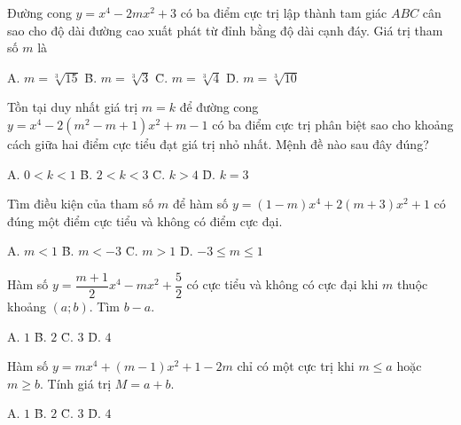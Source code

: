 \vspace{0.3cm}

 Đường cong $y = x^4 - 2mx^2 + 3$ có ba điểm cực trị lập thành tam giác $ABC$ cân sao cho độ dài đường cao xuất phát từ đỉnh bằng độ dài cạnh đáy. Giá trị tham số $m$ là
\begin{tabbing}
A. $m = \sqrt[3]{15}$ \qquad\quad \= B. $m = \sqrt[3]{3}$ \qquad\qquad \= C. $m = \sqrt[3]{4}$ \qquad\quad \= D. $m = \sqrt[3]{10}$
\end{tabbing}

\vspace{0.3cm}

 Tồn tại duy nhất giá trị $m = k$ để đường cong $y = x^4 - 2(m^2 - m + 1)x^2 + m - 1$ có ba điểm cực trị phân biệt sao cho khoảng cách giữa hai điểm cực tiểu đạt giá trị nhỏ nhất. Mệnh đề nào sau đây đúng?
\begin{tabbing}
A. $0 < k < 1$ \qquad\quad \= B. $2 < k < 3$ \qquad\quad \= C. $k > 4$ \qquad\qquad \= D. $k = 3$
\end{tabbing}
 Tìm điều kiện của tham số $m$ để hàm số $y = (1-m)x^4 + 2(m+3)x^2 + 1$ có đúng một điểm cực tiểu và không có điểm cực đại.
\begin{tabbing}
A. $m < 1$ \qquad\qquad\qquad \= B. $m < -3$ \qquad\qquad\qquad \= C. $m > 1$ \qquad\qquad\qquad \= D. $-3 \le m \le 1$
\end{tabbing}

\vspace{0.3cm}

 Hàm số $y = \dfrac{m+1}{2}x^4 - mx^2 + \dfrac{5}{2}$ có cực tiểu và không có cực đại khi $m$ thuộc khoảng $(a;b)$. Tìm $b-a$.
\begin{tabbing}
A. $1$ \qquad\qquad\qquad\qquad \= B. $2$ \qquad\qquad\qquad\qquad \= C. $3$ \qquad\qquad\qquad\qquad \= D. $4$
\end{tabbing}

\vspace{0.3cm}

 Hàm số $y = mx^4 + (m-1)x^2 + 1 - 2m$ chỉ có một cực trị khi $m \le a$ hoặc $m \ge b$. Tính giá trị $M = a + b$.
\begin{tabbing}
A. $1$ \qquad\qquad\qquad\qquad \= B. $2$ \qquad\qquad\qquad\qquad \= C. $3$ \qquad\qquad\qquad\qquad \= D. $4$
\end{tabbing}

